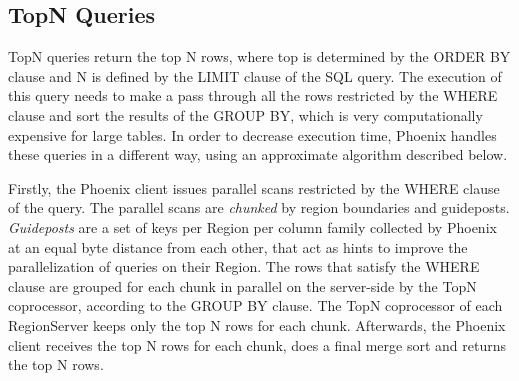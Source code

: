\subsection{TopN Queries}

TopN queries return the top N rows, where top is determined by the ORDER BY clause and N is defined by the LIMIT clause of the SQL query. The execution of this query needs to make a pass through all the rows restricted by the WHERE clause and sort the results of the GROUP BY, which is very computationally expensive  for large tables. In order to decrease execution time, Phoenix handles these queries in a different way, using an approximate algorithm described below.

Firstly, the Phoenix client issues parallel scans restricted by the WHERE clause of the query. The parallel scans are \emph{chunked} by region boundaries and guideposts. \emph{Guideposts} are a set of keys per Region per column family collected by Phoenix at an equal byte distance from each other, that act as hints to improve the parallelization of queries on their Region. The rows that satisfy the WHERE clause are grouped for each chunk in parallel on the server-side by the TopN coprocessor, according to the GROUP BY clause. The TopN coprocessor of each RegionServer keeps only the top N rows for each chunk. Afterwards, the Phoenix client receives the top N rows for each chunk, does a final merge sort and returns the top N rows.

\cleardoublepage